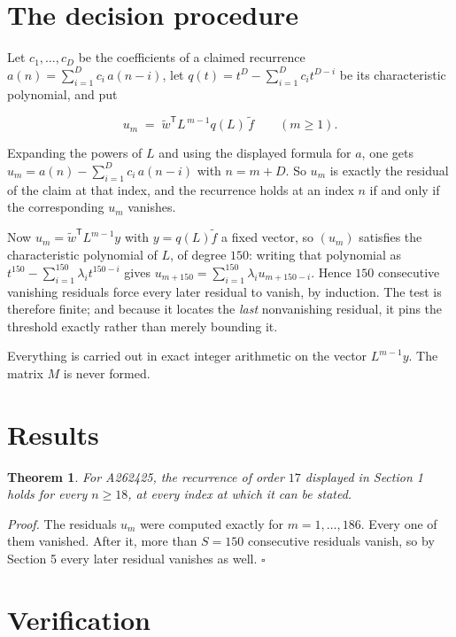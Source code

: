 \documentclass[11pt]{article}
\newtheorem{theorem}{Theorem}
\theoremstyle{definition}
\begin{document}
\section{The decision procedure}

Let $c_1,\dots,c_D$ be the coefficients of a claimed recurrence $a(n) = \sum_{i=1}^{D} c_i\,a(n-i)$, let $q(t) = t^{D} - \sum_{i=1}^{D} c_i t^{D-i}$ be its characteristic polynomial, and put

\[u_m \;=\; \tilde w^{\mathsf T} L^{\,m-1} q(L)\,\tilde f \qquad (m \ge 1).\]

Expanding the powers of $L$ and using the displayed formula for $a$, one gets $u_m = a(n) - \sum_{i=1}^{D} c_i\,a(n-i)$ with $n = m + D$. So $u_m$ is exactly the residual of the claim at that index, and the recurrence holds at an index $n$ if and only if the corresponding $u_m$ vanishes.

Now $u_m = \tilde w^{\mathsf T} L^{m-1} y$ with $y = q(L)\tilde f$ a fixed vector, so $(u_m)$ satisfies the characteristic polynomial of $L$, of degree $150$: writing that polynomial as $t^{150} - \sum_{i=1}^{150} \lambda_i t^{150-i}$ gives $u_{m+150} = \sum_{i=1}^{150} \lambda_i u_{m+150-i}$. Hence $150$ consecutive vanishing residuals force every later residual to vanish, by induction. The test is therefore finite; and because it locates the {\itshape last} nonvanishing residual, it pins the threshold exactly rather than merely bounding it.

Everything is carried out in exact integer arithmetic on the vector $L^{m-1}y$. The matrix $M$ is never formed.

\section{Results}

\begin{theorem} For A262425, the recurrence of order $17$ displayed in Section 1 holds for every $n \ge 18$, at every index at which it can be stated.\end{theorem}

{\itshape Proof.} The residuals $u_m$ were computed exactly for $m = 1,\dots,186$. Every one of them vanished. After it, more than $S = 150$ consecutive residuals vanish, so by Section 5 every later residual vanishes as well. $\square$

\section{Verification}
\end{document}
